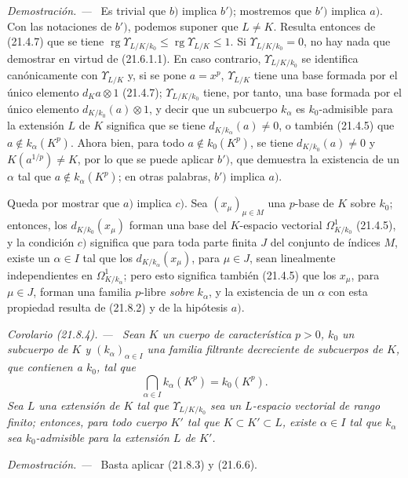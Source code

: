 \documentclass[10pt,oneside]{book}
\makeatletter
\newcommand{\setmanualcurrentlabel}[1]{\def\@currentlabel{#1}}
\newcommand{\oldpage}[2][]{%
  \setcounter{footnote}{0}%
  \marginpar{\scriptsize\textbf{#1}~|~#2}\ignorespaces}
\newenvironment{corollary}[1][]{%
  \setmanualcurrentlabel{#1}\par\medskip\noindent\itshape Corolario (#1). ---\ }{\par}
\newenvironment{proof}{%
  \par\medskip\noindent\textit{Demostración. ---\ }}{\par}
\makeatother
\begin{document}
\begin{proof}
Es trivial que $b)$ implica $b')$; mostremos que $b')$ implica $a)$. Con las
notaciones de $b')$, podemos suponer que $L\ne K$. Resulta entonces de (21.4.7)
que se tiene $\operatorname{rg}\Upsilon_{L/K/k_0}\leqslant\operatorname{rg}\Upsilon_{L/K}\leqslant1$. Si
$\Upsilon_{L/K/k_0}=0$, no hay nada que demostrar en virtud de
(21.6.1.1). En caso contrario, $\Upsilon_{L/K/k_0}$ se identifica
canónicamente con $\Upsilon_{L/K}$ y, si se pone $a=x^p$, $\Upsilon_{L/K}$
tiene una base formada por el único elemento $d_Ka\otimes1$ (21.4.7);
$\Upsilon_{L/K/k_0}$ tiene, por tanto, una base formada por el único
elemento $d_{K/k_0}(a)\otimes1$, y decir que un subcuerpo $k_\alpha$ es
$k_0$-admisible para la extensión $L$ de $K$ significa que se tiene
$d_{K/k_\alpha}(a)\ne0$, o también (21.4.5) que
$a\notin k_\alpha(K^p)$. Ahora bien, para todo $a\notin k_0(K^p)$, se tiene
$d_{K/k_0}(a)\ne0$ y $K(a^{1/p})\ne K$, por lo que se puede aplicar $b')$, que
demuestra la existencia de un $\alpha$ tal que $a\notin k_\alpha(K^p)$; en
otras palabras, $b')$ implica $a)$.

Queda por mostrar que $a)$ implica $c)$. Sea $(x_\mu)_{\mu\in M}$ una
$p$-base de $K$ sobre $k_0$; entonces, los $d_{K/k_0}(x_\mu)$ forman una base
del $K$-espacio vectorial $\Omega^1_{K/k_0}$ (21.4.5), y la condición $c)$
significa que para toda parte finita $J$ del conjunto de índices $M$, existe
un $\alpha\in I$ tal que los $d_{K/k_\alpha}(x_\mu)$, para $\mu\in J$, sean
linealmente independientes en $\Omega^1_{K/k_\alpha}$; pero esto significa
también (21.4.5) que los $x_\mu$, para $\mu\in J$, forman una familia
$p$-libre \emph{sobre} $k_\alpha$, y la existencia de un $\alpha$ con esta propiedad
resulta de (21.8.2) y de la hipótesis $a)$.
\end{proof}
\oldpage[0\textsubscript{IV-1}]{174}

\begin{corollary}[21.8.4]
\label{0.21.8.4-es}
Sean $K$ un cuerpo de característica $p>0$, $k_0$ un subcuerpo de $K$ y
$(k_\alpha)_{\alpha\in I}$ una familia filtrante decreciente de subcuerpos de
$K$, que contienen a $k_0$, tal que
\[
  \bigcap_{\alpha\in I}k_\alpha(K^p)=k_0(K^p).
\]
Sea $L$ una extensión de $K$ tal que $\Upsilon_{L/K/k_0}$ sea un
$L$-espacio vectorial de rango finito; entonces, para todo cuerpo $K'$ tal que
$K\subset K'\subset L$, existe $\alpha\in I$ tal que $k_\alpha$ sea
$k_0$-admisible para la extensión $L$ de $K'$.
\end{corollary}

\begin{proof}
Basta aplicar (21.8.3) y (21.6.6).
\end{proof}
\end{document}
